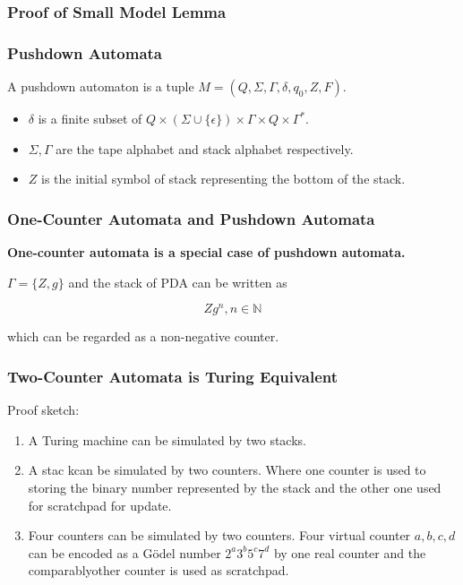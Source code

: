 \documentclass[11pt]{beamer}
\begin{document}
\begin{frame}\frametitle{Proof of Small Model Lemma}

\end{frame}





\iffalse
\begin{frame}\frametitle{Pushdown Automata}
\begin{definition}[PDA]
A pushdown automaton is a tuple $M = (Q, \Sigma, \Gamma, \delta, q_0, Z, F)$.
\begin{itemize}
\item $\delta$ is a finite subset of $Q\times (\Sigma \cup \{\epsilon\}) \times \Gamma \times Q \times \Gamma^*$.
\item $\Sigma, \Gamma$ are the tape alphabet and stack alphabet respectively.
\item $Z$ is the initial symbol of stack representing the bottom of the stack.
\end{itemize}

\end{definition}

\end{frame}
\begin{frame}\frametitle{One-Counter Automata and Pushdown Automata}

\textbf{One-counter automata is a special case of pushdown automata.}

$\Gamma = \{Z, g\}$ and the stack of PDA can be written as 

\[Zg^n, n\in \mathbb{N}\]

which can be regarded as a non-negative counter.



\end{frame}


\begin{frame}\frametitle{Two-Counter Automata is Turing Equivalent}
Proof sketch:
\begin{enumerate}
\item A Turing machine can be simulated by two stacks.
\item A stac kcan be simulated by two counters. Where one counter is used to storing the binary number represented by the stack and the other one used for scratchpad for update. 

\item Four counters can be simulated by two counters. Four virtual counter $a,b,c,d$ can be encoded as a G\"odel number $2^a3^b5^c7^d$ by one real counter and the comparablyother counter is used as scratchpad.
\end{enumerate}
\end{frame}
\end{document}
